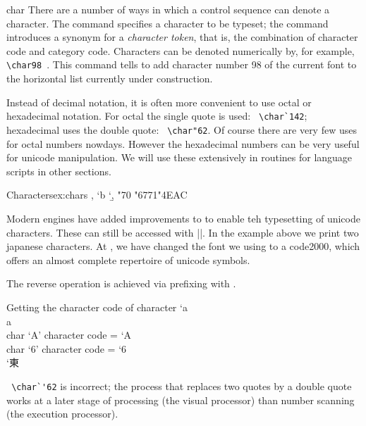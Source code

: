 \begin{docCommand}{char}{}
There are a number of ways in which a control sequence can denote a character. The  command specifies a character to be typeset; the \cmd{\let} command introduces a synonym for a \emph{character
token}, that is, the combination of character code and category code.
\index{\string\char}
Characters can be denoted numerically by, for example, \verb+ \char98 +. This command tells \tex to add
character number 98 of the current font to the horizontal list currently under construction.

Instead of decimal notation, it is often more convenient to use octal or hexadecimal notation. For
octal the single quote is used: \verb+ \char`142+; hexadecimal uses the double quote: \verb+ \char"62+. Of course there are very few uses for octal numbers nowdays. However the hexadecimal numbers can be very useful for unicode manipulation. We will use these extensively in routines for language scripts in other sections.

\end{docCommand}

\begin{texexample}{Characters}{ex:chars}
, 
\char`b 
\char`\b,
\char"70
\bgroup
  \panunicode 
  \char"6771{}\char"4EAC
\egroup
\end{texexample}


Modern engines have added improvements to \tex to enable teh typesetting of unicode characters. These can still be accessed with |\char|. In the example above we print two japanese characters. At , we have changed the font we using to a code2000, which offers an almost complete repertoire of unicode symbols.

The reverse operation is achieved via prefixing with . 

\begin{texexample}{Getting the character code of character}{}
\number`a \\
\meaning a \\
\def\charnum#1{char `#1'  character code = \number`#1}
\charnum A\\
\charnum 6\\
{\panunicode\number`東 }
\end{texexample}

\verb+ \char`'62+  is incorrect; the process that replaces two quotes by a double quote works at a later
stage of processing (the visual processor) than number scanning (the execution processor).

